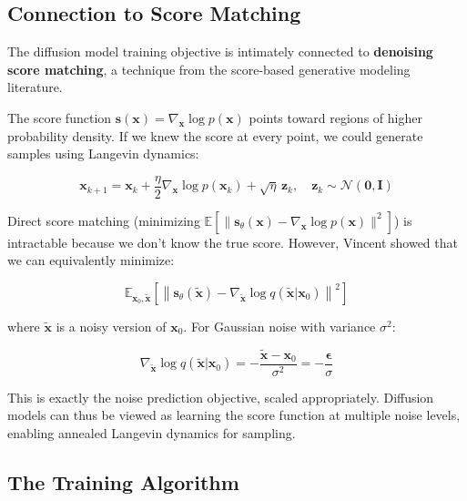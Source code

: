 \subsection{Connection to Score Matching}
\label{subsec:score_matching_connection}

The diffusion model training objective is intimately connected to \textbf{denoising score matching}, a technique from the score-based generative modeling literature.

The score function $\mathbf{s}(\mathbf{x}) = \nabla_\mathbf{x} \log p(\mathbf{x})$ points toward regions of higher probability density. If we knew the score at every point, we could generate samples using Langevin dynamics:

\begin{equation}
\mathbf{x}_{k+1} = \mathbf{x}_k + \frac{\eta}{2}\nabla_\mathbf{x} \log p(\mathbf{x}_k) + \sqrt{\eta}\,\mathbf{z}_k, \quad \mathbf{z}_k \sim \mathcal{N}(\mathbf{0}, \mathbf{I})
\label{eq:langevin}
\end{equation}

Direct score matching (minimizing $\mathbb{E}[\|\mathbf{s}_\theta(\mathbf{x}) - \nabla_\mathbf{x} \log p(\mathbf{x})\|^2]$) is intractable because we don't know the true score. However, Vincent showed that we can equivalently minimize:

\begin{equation}
\mathbb{E}_{\mathbf{x}_0, \tilde{\mathbf{x}}}\left[\left\|\mathbf{s}_\theta(\tilde{\mathbf{x}}) - \nabla_{\tilde{\mathbf{x}}} \log q(\tilde{\mathbf{x}} | \mathbf{x}_0)\right\|^2\right]
\label{eq:denoising_score_matching}
\end{equation}

where $\tilde{\mathbf{x}}$ is a noisy version of $\mathbf{x}_0$. For Gaussian noise with variance $\sigma^2$:

\begin{equation}
\nabla_{\tilde{\mathbf{x}}} \log q(\tilde{\mathbf{x}} | \mathbf{x}_0) = -\frac{\tilde{\mathbf{x}} - \mathbf{x}_0}{\sigma^2} = -\frac{\boldsymbol{\epsilon}}{\sigma}
\label{eq:gaussian_score}
\end{equation}

This is exactly the noise prediction objective, scaled appropriately. Diffusion models can thus be viewed as learning the score function at multiple noise levels, enabling annealed Langevin dynamics for sampling.

\subsection{The Training Algorithm}
\label{subsec:training_algorithm}

